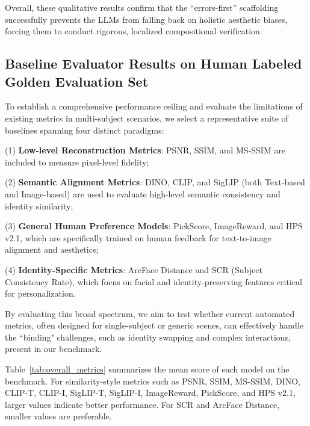 \documentclass{article}
\begin{document}
Overall, these qualitative results confirm that the ``errors-first'' scaffolding successfully prevents the LLMs from falling back on holistic aesthetic biases, forcing them to conduct rigorous, localized compositional verification.

\subsection{Baseline Evaluator Results on Human Labeled Golden Evaluation Set}

To establish a comprehensive performance ceiling and evaluate the limitations of existing metrics in multi-subject scenarios, we select a representative suite of baselines spanning four distinct paradigms: 

(1) \textbf{Low-level Reconstruction Metrics}: PSNR, SSIM, and MS-SSIM are included to measure pixel-level fidelity; 

(2) \textbf{Semantic Alignment Metrics}: DINO, CLIP, and SigLIP (both Text-based and Image-based) are used to evaluate high-level semantic consistency and identity similarity; 

(3) \textbf{General Human Preference Models}: PickScore, ImageReward, and HPS v2.1, which are specifically trained on human feedback for text-to-image alignment and aesthetics; 

(4) \textbf{Identity-Specific Metrics}: ArcFace Distance and SCR (Subject Consistency Rate), which focus on facial and identity-preserving features critical for personalization.

By evaluating this broad spectrum, we aim to test whether current automated metrics, often designed for single-subject or generic scenes, can effectively handle the ``binding" challenges, such as identity swapping and complex interactions, present in our benchmark.

Table~\ref{tab:overall_metrics} summarizes the mean score of each model on the benchmark. For similarity-style metrics such as PSNR, SSIM, MS-SSIM, DINO, CLIP-T, CLIP-I, SigLIP-T, SigLIP-I, ImageReward, PickScore, and HPS v2.1, larger values indicate better performance. For SCR and ArcFace Distance, smaller values are preferable.
\end{document}
